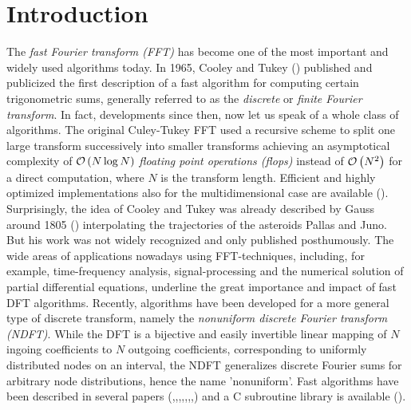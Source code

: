 
\chapter{Introduction}
\label{Introduction}

The \emph{fast Fourier transform (FFT)} has become one of the most important 
and widely used algorithms today. In 1965, Cooley and Tukey (\cite{cotu}) published
and publicized the first description of a fast algorithm for computing certain
trigonometric sums, generally referred to as the \emph{discrete} or 
\emph{finite Fourier transform}. In fact, developments since then, now
let us speak of a whole class of algorithms. The original Culey-Tukey FFT
used a recursive scheme to split one large transform successively into
smaller transforms achieving an asymptotical complexity of 
$\mathcal{O}\left(N \log N\right)$ \emph{floating point operations (flops)} instead of
$\mathcal{O}\left(N^2\right)$ for a direct computation, where $N$ is the transform length. 
Efficient and highly optimized implementations also for the
multidimensional case are available (\cite{fftw}).
Surprisingly, the idea of Cooley and Tukey was already described by Gauss around
1805 (\cite{hejobu}) interpolating the trajectories of the asteroids Pallas 
and Juno. But his work was not widely recognized and only published posthumously.
The wide areas of applications nowadays using FFT-techniques, including, for example, 
time-frequency analysis, signal-processing and the numerical solution of 
partial differential equations, underline the great importance and impact of fast
DFT algorithms.
Recently, algorithms have been developed for a more general type of discrete 
transform, namely the \emph{nonuniform discrete Fourier transform (NDFT)}. 
While the DFT is a bijective and easily invertible linear mapping of $N$ 
ingoing coefficients to $N$ outgoing coefficients, corresponding to
uniformly distributed nodes on an interval, the NDFT generalizes
discrete Fourier sums for arbitrary node distributions, hence the name
'nonuniform'. Fast algorithms have been described in several papers 
(\cite{bey95},\cite{duro93},\cite{fesu02},\cite{four},\cite{Ja},\cite{Pe},\cite{scsc},\cite{ware98}) and a C subroutine library is available 
(\cite{kupo02C}).
